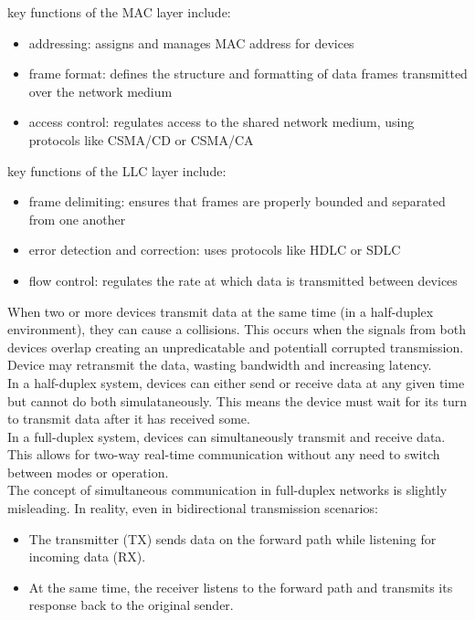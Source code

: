 \documentclass[parindent=0pt]{article}
\begin{document}
key functions of the MAC layer include:
	\begin{itemize}
		\item addressing: assigns and manages MAC address for devices
		\item frame format: defines the structure and formatting of data frames transmitted over the network medium
		\item access control: regulates access to the shared network medium, using protocols like CSMA/CD or CSMA/CA
	\end{itemize}

key functions of the LLC layer include:
	\begin{itemize}
		\item frame delimiting: ensures that frames are properly bounded and separated from one another
		\item error detection and correction: uses protocols like HDLC or SDLC
		\item flow control: regulates the rate at which data is transmitted between devices
	\end{itemize}

When two or more devices transmit data at the same time (in a half-duplex environment), they can cause a collisions. This occurs when the signals from both devices overlap creating an unpredicatable and potentiall corrupted transmission. Device may retransmit the data, wasting bandwidth and increasing latency.\\ 

In a half-duplex system, devices can either send or receive data at any given time but cannot do both simulataneously. This means the device must wait for its turn to transmit data after it has received some.\\

In a full-duplex system, devices can simultaneously transmit and receive data. This allows for two-way real-time communication without any need to switch between modes or operation.\\

The concept of simultaneous communication in full-duplex networks is slightly misleading. In reality, even in bidirectional transmission scenarios:
	\begin{itemize}
		\item The transmitter (TX) sends data on the forward path while listening for incoming data (RX).
		\item At the same time, the receiver listens to the forward path and transmits its response back to the original sender.
	\end{itemize}
\end{document}
